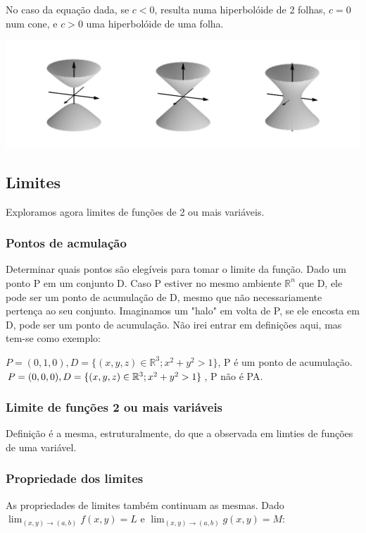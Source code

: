 \documentclass[letterpaper, 11pt]{article}
\begin{document}
No caso da equação dada, se \(c<0\), resulta numa hiperbolóide de 2 folhas, \(c=0\) num cone, e \(c>0\) uma hiperbolóide de uma folha.

\begin{center}
\includegraphics[width=.9\linewidth]{./img/supnivel.png}
\end{center}

\subsection{Limites}
\label{sec:org43928a9}
Exploramos agora limites de funções de 2 ou mais variáveis.

\subsubsection{Pontos de acmulação}
\label{sec:org2183089}
Determinar quais pontos são elegíveis para tomar o limite da função. Dado um ponto P em um conjunto D. Caso P estiver no mesmo ambiente \(\mathbb{R}^n\) que D, ele pode ser um ponto de acumulação de D,
mesmo que não necessariamente pertença ao seu conjunto. Imaginamos um "halo" em volta de P, se ele encosta em D, pode ser um ponto de acumulação. Não irei entrar em definições aqui, mas
tem-se como exemplo:

\begin{center} $P = (0,1,0), D = \{(x,y,z) \in \mathbb{R}^3; x^2 + y^2 > 1\}$, P é um ponto de acumulação. $\\ P=(0,0,0), D = \{(x,y,z) \in \mathbb{R}^3; x^2 + y^2 > 1\}$, P não é PA. \end{center}

\subsubsection{Limite de funções 2 ou mais variáveis}
\label{sec:org8723cfc}
Definição é a mesma, estruturalmente, do que a observada em limties de funções de uma variável.

\subsubsection{Propriedade dos limites}
\label{sec:orgab765fa}
As propriedades de limites também continuam as mesmas. Dado \(\lim_{(x,y) \to (a,b)} f(x,y) = L\) e \(\lim_{(x,y) \to (a,b)} g(x,y) = M\):
\end{document}
